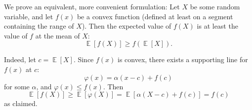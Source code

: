 \documentclass[12pt]{article}
\newcommand{\Expect}{\operatorname{\mathbb{E}}}
\begin{document}
We prove an equivalent, more convenient formulation:  Let $X$ be some random variable, and let $f(x)$ be a convex function (defined at least on a segment containing the range of $X$).  Then the expected value of $f(X)$ is at least the value of $f$ at the mean of $X$:
$$
\Expect[f(X)] \ge f(\Expect [X]).
$$

Indeed, let $c=\Expect [X]$.  Since $f(x)$ is convex, there exists a supporting line for $f(x)$ at $c$:
$$
\varphi(x)=\alpha (x-c) + f(c)
$$
for some $\alpha$, and $\varphi(x)\le f(x)$.  Then
$$
\Expect[f(X)] \ge \Expect[\varphi(X)] = \Expect[\alpha (X-c) + f(c)] = f(c)
$$
as claimed.
\end{document}
